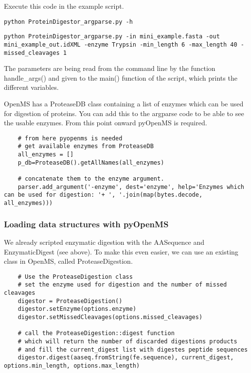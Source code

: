 {\noindent Execute this code in the example script.
\begin{lstlisting}
python ProteinDigestor_argparse.py -h
\end{lstlisting}

\begin{lstlisting}
python ProteinDigestor_argparse.py -in mini_example.fasta -out mini_example_out.idXML -enzyme Trypsin -min_length 6 -max_length 40 -missed_cleavages 1
\end{lstlisting}

\noindent The parameters are being read from the command line by the function handle\_args() and given to the main() function of the script, which prints the different variables.

\noindent OpenMS has a ProteaseDB  class containing a list of enzymes which can be used for digestion of proteins. You can add this to the argparse code to be able to see the usable enzymes. From this point onward pyOpenMS is required. 
\begin{lstlisting}
    # from here pyopenms is needed
    # get available enzymes from ProteaseDB
    all_enzymes = []
    p_db=ProteaseDB().getAllNames(all_enzymes)
    
    # concatenate them to the enzyme argument.
    parser.add_argument('-enzyme', dest='enzyme', help='Enzymes which can be used for digestion: '+ ', '.join(map(bytes.decode, all_enzymes)))
\end{lstlisting}

\subsubsection{Loading data structures with pyOpenMS}
We already scripted enzymatic digestion with the AASequence and EnzymaticDigest (see above). To make this even easier, we can use an existing class in OpenMS, called ProteaseDigestion.

\begin{lstlisting}
    # Use the ProteaseDigestion class
    # set the enzyme used for digestion and the number of missed cleavages
    digestor = ProteaseDigestion()
    digestor.setEnzyme(options.enzyme)
    digestor.setMissedCleavages(options.missed_cleavages)
    
    # call the ProteaseDigestion::digest function
    # which will return the number of discarded digestions products  
    # and fill the current_digest list with digestes peptide sequences
    digestor.digest(aaseq.fromString(fe.sequence), current_digest, options.min_length, options.max_length)
\end{lstlisting}

}
